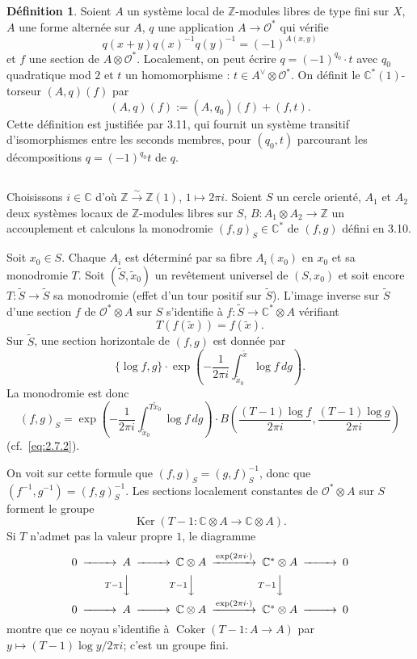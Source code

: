 \documentclass[12pt,a4paper]{article}
\theoremstyle{plain}
\theoremstyle{definition}
\newtheorem{definition}[theorem]{Définition}
\theoremstyle{remark}
\DeclareMathOperator{\Ker}{Ker}
\DeclareMathOperator{\Coker}{Coker}
\newcommand{\cO}{\mathcal{O}}
\newcommand{\Z}{\mathbb{Z}}
\newcommand{\C}{\mathbb{C}}
\providecommand{\cO}{\mathcal{O}}
\providecommand{\Ker}{\operatorname{Ker}}
\providecommand{\Coker}{\operatorname{Coker}}
\begin{document}
\begin{definition}
Soient $A$ un système local de $\Z$-modules libres de type fini sur $X$,
$A$ une forme alternée sur $A$, $q$ une application $A \to \cO^*$ qui vérifie
\[
q(x+y)q(x)^{-1}q(y)^{-1} = (-1)^{A(x,y)}
\]
et $f$ une section de $A \otimes \cO^*$. Localement, on peut écrire $q = (-1)^{q_0} \cdot t$ avec $q_0$ quadratique mod $2$ et $t$
un homomorphisme : $t \in A^\vee \otimes \cO^*$. On définit le $\C^*(1)$-torseur $(A, q)(f)$ par
\[
(A, q)(f) := (A, q_0)(f) + (f, t).
\]
Cette définition est justifiée par 3.11, qui fournit un système transitif d'isomorphismes entre les seconds membres, pour $(q_0, t)$ parcourant les décompositions
$q = (-1)^{q_0} t$ de $q$.
\end{definition}

\subsection{}

Choisissons $i \in \C$ d'où $\Z \xrightarrow{\sim} \Z(1)$, $1 \mapsto 2\pi i$. Soient $S$ un cercle orienté, $A_1$
et $A_2$ deux systèmes locaux de $\Z$-modules libres sur $S$, $B : A_1 \otimes A_2 \to \Z$ un accouplement
et calculons la monodromie $(f,g)_S \in \C^*$ de $(f,g)$ défini en 3.10.

Soit $x_0 \in S$. Chaque $A_i$ est déterminé par sa fibre $A_i(x_0)$ en $x_0$ et sa monodromie $T$.
Soit $(\tilde{S}, \tilde{x}_0)$ un revêtement universel de $(S, x_0)$ et soit encore $T : \tilde{S} \to \tilde{S}$ sa monodromie
(effet d'un tour positif sur $\tilde{S}$). L'image inverse sur $\tilde{S}$ d'une section $f$ de $\cO^* \otimes A$ sur $S$ s'identifie à $f : \tilde{S} \to \C^* \otimes A$ vérifiant
\[
T(f(\tilde{x})) = f(\tilde{x}).
\]
Sur $\tilde{S}$, une section horizontale de $(f,g)$ est donnée par
\[
\{\log f, g\} \cdot \exp\left(-\frac{1}{2\pi i} \int_{\tilde{x}_0}^{\tilde{x}} \log f \, dg\right).
\]
La monodromie est donc
\begin{equation}\label{eq:3.13.1}
(f, g)_S = \exp\left(-\frac{1}{2\pi i} \int_{\tilde{x}_0}^{T\tilde{x}_0} \log f \, dg\right) \cdot B\left(\frac{(T-1)\log f}{2\pi i}, \frac{(T-1)\log g}{2\pi i}\right)
\end{equation}
(cf.~\eqref{eq:2.7.2}).

On voit sur cette formule que $(f,g)_S = (g,f)_S^{-1}$, donc que $(f^{-1}, g^{-1}) = (f,g)_S^{-1}$.
Les sections localement constantes de $\cO^* \otimes A$ sur $S$ forment le groupe
\[
\Ker(T - 1 : \C \otimes A \to \C \otimes A).
\]
Si $T$ n'admet pas la valeur propre $1$, le diagramme
\[
\begin{CD}
0 @>>> A @>>> \C \otimes A @>{\exp(2\pi i \cdot)}>> \C^* \otimes A @>>> 0 \\
@. @V{T-1}VV @V{T-1}VV @V{T-1}VV \\
0 @>>> A @>>> \C \otimes A @>{\exp(2\pi i \cdot)}>> \C^* \otimes A @>>> 0
\end{CD}
\]
montre que ce noyau s'identifie à $\Coker(T - 1 : A \to A)$ par $y \mapsto (T-1)\log y / 2\pi i$;
c'est un groupe fini.
\end{document}
